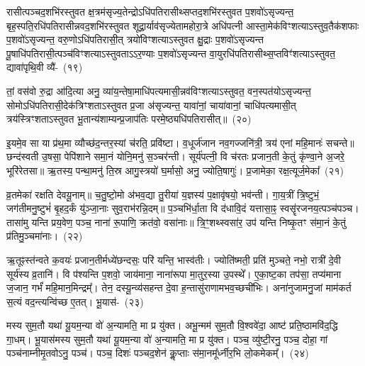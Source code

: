 रासीत्पञ्चद॒शभि॑\-रस्तुवत क्ष॒त्रम॑सृज्य॒तेन्द्रो\-ऽधि॑\-पतिरासीथ्सप्त\-द॒शभि॑\-रस्तुवत प॒शवो॑\-ऽसृज्यन्त॒ बृह॒स्पति॒\-रधि॑\-पतिरासी\-न्नव\-द॒शभि॑\-रस्तुवत शूद्रा॒र्याव॑सृज्येतामहोरा॒त्रे अधि॑पत्नी आस्ता॒\-मेक॑\-विꣳशत्या\-ऽ\-स्तुव॒तैक॑शफाः प॒शवो॑\-ऽसृज्यन्त॒ वरु॒णो\-ऽधि॑\-पतिरासी॒त् त्रयो॑विꣳशत्या\-ऽ\-स्तुवत क्षु॒द्राः प॒शवो॑\-ऽसृज्यन्त पू॒षाधि॑\-पतिरासी॒त्पञ्च॑विꣳशत्या\-ऽ\-स्तुवता\-ऽ\-ऽ\-र॒ण्याः प॒शवो॑\-ऽसृज्यन्त वा॒यु\-रधि॑\-पतिरासीथ्स॒प्तविꣳ॑शत्या\-ऽ\-स्तुवत॒ द्यावा॑\-पृथि॒वी व्यै॑-~(१९)

तां॒ वस॑वो रु॒द्रा आ॑दि॒त्या अनु॒ व्या॑य॒न्तेषा॒माधि॑\-पत्यमासी॒न्नव॑\-विꣳशत्या\-ऽ\-स्तुवत॒ वन॒स्पत॑यो\-ऽसृज्यन्त॒ सोमो\-ऽ\-धि॑\-पतिरासी॒देक॑त्रिꣳशता\-ऽ\-स्तुवत प्र॒जा अ॑सृज्यन्त॒ यावा॑नां॒ चाया॑वानां॒ चाधि॑पत्यमासी॒त् त्रय॑स्त्रिꣳशता\-ऽ\-स्तुवत भू॒तान्य॑शाम्यन्प्र॒जा\-प॑तिः परमे॒ष्ठ्यधि॑\-पतिरासीत्॥~(२०)

{\anuvakamend[{सं॒ व॒थ्स॒रो\-ऽधि॑\-पति॒र्वि पञ्च॑त्रिꣳशच्च}]}%

इ॒यमे॒व सा या प्र॑थ॒मा व्यौच्छ॑द॒न्तर॒स्यां च॑रति॒ प्रवि॑ष्टा। व॒धूर्ज॑जान नव॒गज्जनि॑त्री॒ त्रय॑ एनां महि॒मानः॑ सचन्ते॥ छन्द॑स्वती उ॒षसा॒ पेपि॑शाने समा॒नं योनि॒मनु॑ स॒ञ्चर॑न्ती। सूर्य॑पत्नी॒ वि च॑रतः प्रजान॒ती के॒तुं कृ॑ण्वा॒ने अ॒जरे॒ भूरि॑रेतसा॥ ऋ॒तस्य॒ पन्था॒मनु॑ ति॒स्र आगु॒स्त्रयो॑ घ॒र्मासो॒ अनु॒ ज्योति॒षागुः॑। प्र॒जामेका॒ रक्ष॒त्यूर्ज॒मेका᳚~(२१)

व्र॒तमेका॑ रक्षति देवयू॒नाम्॥ च॒तु॒ष्टो॒मो अ॑भव॒द्या तु॒रीया॑ य॒ज्ञस्य॑ प॒क्षावृ॑षयो॒ भव॑न्ती। गा॒य॒त्रीं त्रि॒ष्टुभं॒ जग॑तीमनु॒ष्टुभं॑ बृ॒हद॒र्कं यु॑ञ्जा॒नाः सुव॒राभ॑रन्नि॒दम्॥ प॒ञ्चभि॑र्धा॒ता वि द॑धावि॒दं यत्तासा॒ꣴ॒ स्वसॄ॑रजनय॒त्पञ्च॑पञ्च। तासा॑मु यन्ति प्रय॒वेण॒ पञ्च॒ नाना॑ रू॒पाणि॒ क्रत॑वो॒ वसा॑नाः॥ त्रि॒ꣳ॒शथ्स्वसा॑र॒ उप॑ यन्ति निष्कृ॒तꣳ स॑मा॒नं के॒तुं प्र॑तिमु॒ञ्चमा॑नाः।~(२२)

ऋ॒तूꣴस्त॑न्वते क॒वयः॑ प्रजान॒तीर्मध्ये॑छन्दसः॒ परि॑ यन्ति॒ भास्व॑तीः। ज्योति॑ष्मती॒ प्रति॑ मुञ्चते॒ नभो॒ रात्री॑ दे॒वी सूर्य॑स्य व्र॒तानि॑। वि प॑श्यन्ति प॒शवो॒ जाय॑माना॒ नाना॑रूपा मा॒तुर॒स्या उ॒पस्थे᳚। ए॒का॒ष्ट॒का तप॑सा॒ तप्य॑माना ज॒जान॒ गर्भं॑ महि॒मान॒मिन्द्रम्᳚। तेन॒ दस्यू॒न्व्य॑सहन्त दे॒वा ह॒न्तासु॑राणामभव॒च्छची॑भिः। अना॑नुजामनु॒जां माम॑कर्त स॒त्यं वद॒न्त्यन्वि॑च्छ ए॒तत्। भू॒यास॑-~(२३)

मस्य सुम॒तौ यथा॑ यू॒यम॒न्या वो॑ अ॒न्यामति॒ मा प्र यु॑क्त। अभू॒न्मम॑ सुम॒तौ वि॒श्ववे॑दा॒ आष्ट॑ प्रति॒ष्ठामवि॑द॒द्धि गा॒धम्। भू॒यास॑मस्य सुम॒तौ यथा॑ यू॒यम॒न्या वो॑ अ॒न्यामति॒ मा प्र यु॑क्त। पञ्च॒ व्यु॑ष्टी॒रनु॒ पञ्च॒ दोहा॒ गां पञ्च॑नाम्नीमृ॒तवो\-ऽनु॒ पञ्च॑। पञ्च॒ दिशः॑ पञ्च\-द॒शेन॑ कॢ॒प्ताः स॑मा॒नमू᳚र्ध्नीर॒भि लो॒कमेकम्᳚।~(२४)

